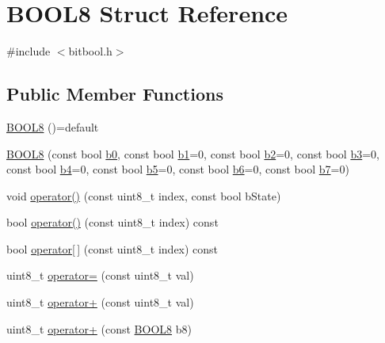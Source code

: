 \hypertarget{struct_b_o_o_l8}{}\section{B\+O\+O\+L8 Struct Reference}
\label{struct_b_o_o_l8}


{\ttfamily \#include $<$bitbool.\+h$>$}

\subsection*{Public Member Functions}
\begin{DoxyCompactItemize}
\item 
\hyperlink{struct_b_o_o_l8_a0626071cdc108385bd3b9f15ab0745a9}{B\+O\+O\+L8} ()=default
\item 
\hyperlink{struct_b_o_o_l8_ad5e49046c2e60c0a3349c4c864deab15}{B\+O\+O\+L8} (const bool \hyperlink{struct_b_o_o_l8_a92d3ed58a5512657583cd9926342c99e}{b0}, const bool \hyperlink{struct_b_o_o_l8_a699c85868039c9754d65914930ad30eb}{b1}=0, const bool \hyperlink{struct_b_o_o_l8_a49da127bcc938c52c198397e4288f826}{b2}=0, const bool \hyperlink{struct_b_o_o_l8_a74a24b53dcf41471af36714c18865e71}{b3}=0, const bool \hyperlink{struct_b_o_o_l8_a35fb9d62b5bd70f8bf4c4caf0bc48624}{b4}=0, const bool \hyperlink{struct_b_o_o_l8_a39278ea0628859d4dd54764b6c086d51}{b5}=0, const bool \hyperlink{struct_b_o_o_l8_a8e2e1da9c87724e0ae7df2b5c423e232}{b6}=0, const bool \hyperlink{struct_b_o_o_l8_a64c85814c094ff655b3c9c4a48e9c8be}{b7}=0)
\item 
void \hyperlink{struct_b_o_o_l8_aaa6b5d11f940b5b3d7de7563e8195899}{operator()} (const uint8\+\_\+t index, const bool b\+State)
\item 
bool \hyperlink{struct_b_o_o_l8_a758aa26902738ace2ecbfea98a7c702a}{operator()} (const uint8\+\_\+t index) const
\item 
bool \hyperlink{struct_b_o_o_l8_ad10cb86a21ffea65e2c307c7d39fc099}{operator\mbox{[}$\,$\mbox{]}} (const uint8\+\_\+t index) const
\item 
uint8\+\_\+t \hyperlink{struct_b_o_o_l8_a7b521b048b49883d0817a6abf2093f56}{operator=} (const uint8\+\_\+t val)
\item 
uint8\+\_\+t \hyperlink{struct_b_o_o_l8_aaaa2f1f546b5477c408bc09c646274d2}{operator+} (const uint8\+\_\+t val)
\item 
uint8\+\_\+t \hyperlink{struct_b_o_o_l8_a75e8ecea46c8e43f6d16f99185114a9a}{operator+} (const \hyperlink{struct_b_o_o_l8}{B\+O\+O\+L8} b8)
\item 

\end{DoxyCompactItemize}
